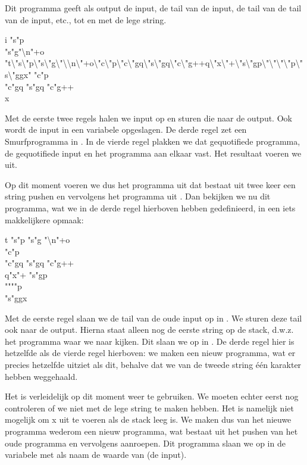 \begin{exmp}
	Dit programma geeft als output de input, de tail van de input, de tail van de
	tail van de input, etc., tot en met de lege string.
	\begin{smurf}
		\footnotesize
		i "s"p \\
		"s"g"\textbackslash{}n"+o \\
		"t\textbackslash{}"s\textbackslash{}"p\textbackslash{}"s\textbackslash{}"g\textbackslash{}"\textbackslash{}\textbackslash{}n\textbackslash{}"+o\textbackslash{}"c\textbackslash{}"p\textbackslash{}"c\textbackslash{}"gq\textbackslash{}"s\textbackslash{}"gq\textbackslash{}"c\textbackslash{}"g++q\textbackslash{}"x\textbackslash{}"+\textbackslash{}"s\textbackslash{}"gp\textbackslash{}"\textbackslash{}"\textbackslash{}"\textbackslash{}"p\textbackslash{}"s\textbackslash{}"ggx" "c"p \\
		"c"gq "s"gq "c"g++ \\
		x
	\end{smurf}
	Met de eerste twee regels halen we input op en sturen die naar de output. Ook
	wordt de input in een variabele  opgeslagen.  De derde regel zet een
	Smurfprogramma in .  In de vierde regel plakken we dat gequotifiede
	programma, de gequotifiede input en het programma aan elkaar vast. Het
	resultaat voeren we uit.

	Op dit moment voeren we dus het programma uit dat bestaat uit twee keer een
	string pushen en vervolgens het programma uit . Dan bekijken we nu dit
	programma, wat we in de derde regel hierboven hebben gedefinieerd, in een
	iets makkelijkere opmaak:
	\begin{smurf}
		t "s"p "s"g "\textbackslash{}n"+o \\
		"c"p \\
		"c"gq "s"gq "c"g++ \\
		q"x"+ "s"gp \\
		""""p \\
		"s"ggx
	\end{smurf}
	Met de eerste regel slaan we de tail van de oude input op in . We
	sturen deze tail ook naar de output. Hierna staat alleen nog de eerste string
	op de stack, d.w.z. het programma waar we naar kijken. Dit slaan we op in
	. De derde regel hier is hetzelfde als de vierde regel hierboven: we
	maken een nieuw programma, wat er precies hetzelfde uitziet als dit, behalve
	dat we van de tweede string één karakter hebben weggehaald.

	Het is verleidelijk op dit moment weer  te gebruiken. We
	moeten echter eerst nog controleren of we niet met de lege string te maken
	hebben. Het is namelijk niet mogelijk om x uit te voeren als de stack leeg
	is. We maken dus van het nieuwe programma wederom een nieuw programma, wat
	bestaat uit het pushen van het oude programma en vervolgens 
	aanroepen. Dit programma slaan we op in de variabele met als naam de waarde
	van  (de input).


\end{exmp}
